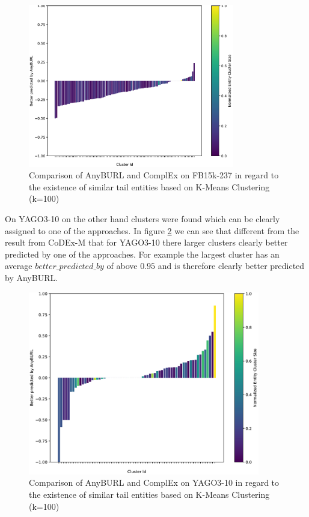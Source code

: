 \begin{figure}[H]
\centering
\includegraphics[width=0.8\textwidth]{images/tail_cluster_100_anyburl_complex_fb15k.PNG}
\caption{Comparison of AnyBURL and ComplEx on FB15k-237 in regard to the existence of similar tail entities based on K-Means Clustering (k=100)}
\label{fig:tail_cluster_100_anyburl_complex_fb15k}
\end{figure}

On YAGO3-10 on the other hand clusters were found which can be clearly assigned to one of the approaches. In figure \ref{fig:tail_cluster_100_anyburl_complex_yago} we can see that different from the result from CoDEx-M that for YAGO3-10 there larger clusters clearly better predicted by one of the approaches. For example the largest cluster has an average $better\_predicted\_by$ of above $0.95$ and is therefore clearly better predicted by AnyBURL.

\begin{figure}[H]
\centering
\includegraphics[width=0.9\textwidth]{images/tail_cluster_100_anyburl_complex_yago.PNG}
\caption{Comparison of AnyBURL and ComplEx on YAGO3-10 in regard to the existence of similar tail entities based on K-Means Clustering (k=100)}
\label{fig:tail_cluster_100_anyburl_complex_yago}
\end{figure}



